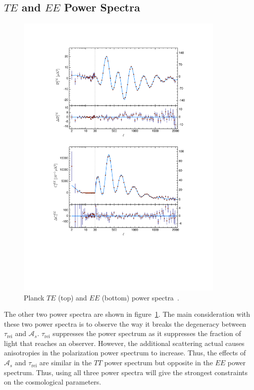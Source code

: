 \subsection{\texorpdfstring{$TE$ and $EE$ Power Spectra}{TE and EE Power Spectra}}
\begin{figure}
    \centering
    \includegraphics[width=0.9\textwidth]{plots/planck_TE_EE.pdf}
    \caption{Planck $TE$ (top) and $EE$ (bottom) power spectra~\cite{planck_collaboration_planck_2020}.}
    \label{fig:planck_te_ee}
\end{figure}
The other two power spectra are shown in figure~\ref{fig:planck_te_ee}. The main consideration with these two power spectra is to observe the way it breaks the degeneracy between $\tau_\mathrm{rei}$ and $\mathcal{A}_s$. $\tau_{\mathrm{rei}}$ suppresses the power spectrum as it suppresses the fraction of light that reaches an observer. However, the additional scattering actual causes anisotropies in the polarization power spectrum to increase. Thus, the effects of $\mathcal{A}_s$ and $\tau_\mathrm{rei}$ are similar in the $TT$ power spectrum but opposite in the $EE$ power spectrum. Thus, using all three power spectra will give the strongest constraints on the cosmological parameters.
